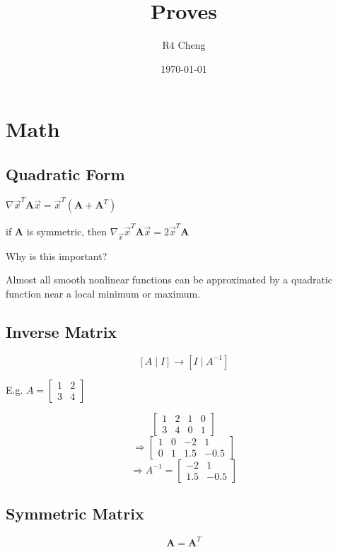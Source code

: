 \documentclass[12pt,a4paper]{article}
\title{Proves}
\author{R4 Cheng}
\date{\today}
\begin{document}
\maketitle

\section*{Math}

\subsection*{Quadratic Form}

$\nabla \vec{x}^T\mathbf{A}\vec{x} = \vec{x}^T(\mathbf{A} + \mathbf{A}^T)$

if $\mathbf{A}$ is symmetric, then $\nabla_{\vec{x}} \vec{x}^T\mathbf{A}\vec{x} = 2\vec{x}^T\mathbf{A}$

Why is this important?

Almost all smooth nonlinear functions can be approximated by a quadratic function near a local minimum or maximum.

\subsection*{Inverse Matrix}

\[[ A \mid I ] \xrightarrow{} [ I \mid A^{-1} ]\]

E.g. $A = \begin{bmatrix} 1 & 2 \\ 3 & 4 \end{bmatrix}$

\[\left[ \begin{array}{cc|cc} 1 & 2 & 1 & 0 \\ 3 & 4 & 0 & 1 \end{array} \right]\]
\[\Rightarrow \left[ \begin{array}{cc|cc} 1 & 0 & -2 & 1 \\ 0 & 1 & 1.5 & -0.5 \end{array} \right]\]
\[\Rightarrow A^{-1} = \begin{bmatrix} -2 & 1 \\ 1.5 & -0.5 \end{bmatrix}\]


\subsection*{Symmetric Matrix}

\[\mathbf{A} = \mathbf{A}^T\]
\end{document}
